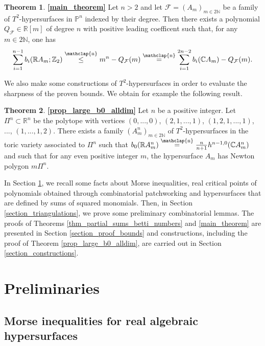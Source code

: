 \documentclass[12pt]{article}
\newcommand\customeq{\stackrel{\mathclap{\normalfont\scriptsize\mbox{n}}}{=}}
\newcommand\customleq{\stackrel{\mathclap{\normalfont\scriptsize\mbox{n}}}{\leq}}
\newcommand{\R}{\mathbb{R}}
\newcommand{\C}{\mathbb{C}}
\renewcommand{\P}{\mathbb{P}}
\newcommand{\Z}{\mathbb{Z}}
\newcommand{\N}{\mathbb{N}}
\theoremstyle{definition}
\newtheorem*{thm*}{Theorem}
\begin{document}
\begin{thm*}
    \textbf{\ref{main_theorem}}
    Let $n >2$ and let $\mathcal{F} = (A_m)_{m \in 2\mathbb{N}}$ be a family of $T^2$-hypersurfaces in $\P^n$ indexed by their degree. Then there exists a polynomial $Q_{\mathcal{F}} \in \R[m]$ of degree $n$ with positive leading coefficent such that, for any $m \in 2 \N$, one has
    \begin{equation*}
        \sum_{i = 1}^{n-1} b_i(\R A_m; \Z_2) \customleq m^n - Q_{\mathcal{F}}(m) \customeq \sum_{i = 1}^{2n-2} b_i(\C A_m) - Q_{\mathcal{F}}(m).
    \end{equation*}
\end{thm*}

We also make some constructions of $T^2$-hypersurfaces in order to evaluate the sharpness of the proven bounds. We obtain for example the following result.

\begin{thm*}
    \textbf{\ref{prop_large_b0_alldim}}
    Let $n$ be a positive integer.
    Let $\Pi^n \subset \R^n$ be the polytope with vertices $(0,...,0)$, $(2,1,...,1)$, $(1,2,1,...,1)$, ..., $(1,...,1,2)$. There exists a family $(A_m^n)_{m \in 2\N}$ of $T^2$-hypersurfaces in the toric variety associated to $\Pi^n$ such that $b_0(\R A_m^n) \customeq \frac{n}{n+1}h^{n-1,0}(\C A_m^n)$ and such that for any even positive integer $m$, the hypersurface $A_m$ has Newton polygon $m\Pi^n$.
\end{thm*}

In Section \ref{section_real_crit_pts}, we recall some facts about Morse inequalities, real critical points of polynomials obtained through combinatorial patchworking and hypersurfaces that are defined by sums of squared monomials. Then, in Section \ref{section_triangulations}, we prove some preliminary combinatorial lemmas. The proofs of Theorems \ref{thm_partial_sums_betti_numbers} and \ref{main_theorem} are presented in Section \ref{section_proof_bounds} and constructions, including the proof of Theorem \ref{prop_large_b0_alldim}, are carried out in Section \ref{section_constructions}.

%

\section{Preliminaries}

\label{section_real_crit_pts}

\subsection{Morse inequalities for real algebraic hypersurfaces }
\end{document}

